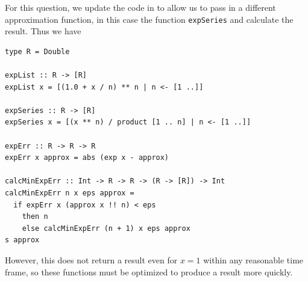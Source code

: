 For this question, we update the code in  to allow us
to pass in a different approximation function, in this case the function \verb|expSeries|
and calculate the result. Thus we have
\begin{lstlisting}
type R = Double

expList :: R -> [R]
expList x = [(1.0 + x / n) ** n | n <- [1 ..]]

expSeries :: R -> [R]
expSeries x = [(x ** n) / product [1 .. n] | n <- [1 ..]]

expErr :: R -> R -> R
expErr x approx = abs (exp x - approx)

calcMinExpErr :: Int -> R -> R -> (R -> [R]) -> Int
calcMinExpErr n x eps approx =
  if expErr x (approx x !! n) < eps
    then n
    else calcMinExpErr (n + 1) x eps approx
s approx
\end{lstlisting}
However, this does not return a result even for $x = 1$ within any reasonable time frame,
so these functions must be optimized to produce a result more quickly.
